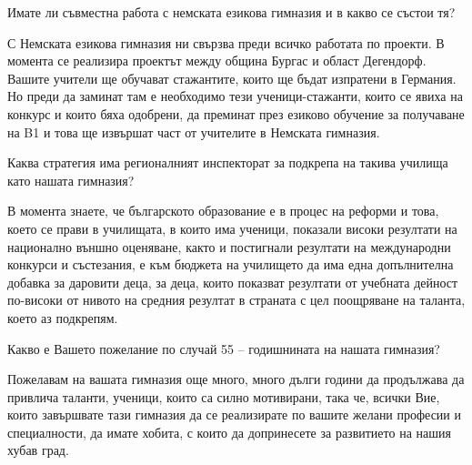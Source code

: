 \begin{multicols}{3}
Имате ли съвместна работа с немската езикова гимназия и в какво се състои тя?

С Немската езикова гимназия ни свързва преди всичко работата по проекти.  В момента се реализира  проектът между община Бургас и област Дегендорф. Вашите учители ще обучават стажантите, които ще бъдат изпратени в Германия. Но преди да заминат там е необходимо тези ученици-стажанти, които се явиха на конкурс и които бяха одобрени,  да преминат през езиково обучение за получаване на B1 и 
това ще извършат част от учителите в Немската гимназия.

Каква стратегия има регионалният инспекторат за подкрепа на такива училища като нашата гимназия?

В момента знаете, че българското образование е в процес на реформи и това, което се прави в училищата, в които има ученици, показали високи резултати на национално външно оценяване, както и постигнали резултати на международни конкурси и състезания, е към бюджета на училището да има една допълнителна добавка за даровити деца, за деца, които показват резултати от учебната дейност по-високи от нивото на средния резултат в страната с цел поощряване на таланта, което аз подкрепям.

Какво е Вашето пожелание по случай 55 – годишнината на нашата гимназия?

Пожелавам на вашата гимназия още много, много дълги години да продължава да привлича таланти, ученици, които са силно мотивирани, така че, всички Вие, които завършвате тази гимназия да се реализирате по вашите желани професии и специалности, да имате хобита, с които да допринесете за развитието на нашия хубав град.
\closearticle
\end{multicols}
